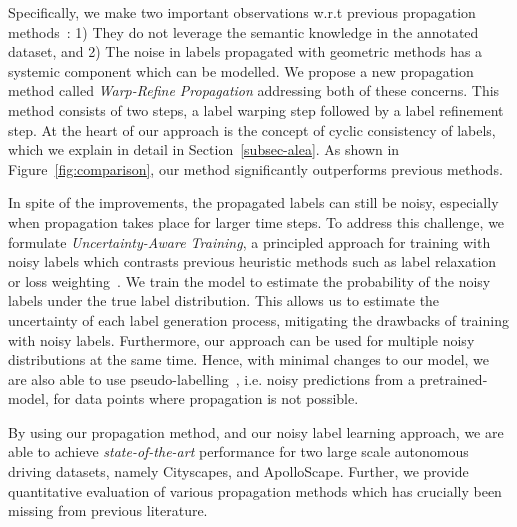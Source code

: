 Specifically, we make two important observations w.r.t previous propagation methods~\cite{lp_eccv, nvidia_cvpr19}: 1) They do not leverage the semantic knowledge in the annotated dataset, and 2) The noise in labels propagated with geometric methods has a systemic component which can be modelled. We propose a new propagation method called \emph{Warp-Refine Propagation} addressing both of these concerns. This method consists of two steps, a label warping step followed by a label refinement step. At the heart of our approach is the concept of cyclic consistency of labels, which we explain in detail in Section~\ref{subsec-alea}. As shown in Figure~\ref{fig:comparison}, our method significantly outperforms previous methods. 

In spite of the improvements, the propagated labels can still be noisy, especially when propagation takes place for larger time steps. 
To address this challenge, we formulate \emph{Uncertainty-Aware Training}, a principled approach for training with noisy labels which contrasts previous heuristic methods such as label relaxation~\cite{nvidia_cvpr19} or loss weighting~\cite{lp_eccv}. 
We train the model to estimate the probability of the noisy labels under the true label distribution. This allows us to estimate the uncertainty of each label generation process, mitigating the drawbacks of training with noisy labels.
Furthermore, our approach can be used for multiple noisy distributions at the same time. Hence, with minimal changes to our model, we are also able to use pseudo-labelling~\cite{taskonomy2018,pseudo_nips_1}, i.e. noisy predictions from a pretrained-model, for data points where propagation is not possible. 

By using our propagation method, and our noisy label learning approach, we are able to achieve \textit{state-of-the-art} performance for two large scale autonomous driving datasets, namely Cityscapes, and ApolloScape. Further, we provide quantitative evaluation of various propagation methods which has crucially been missing from previous literature.

